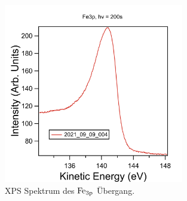             \begin{figure}
                \centering
                \includegraphics[width=0.7\textwidth]{./content/pictures/FeO/XPS_Fe3p.png}
                \caption{XPS Spektrum des $\ce{Fe}_{3\text{p}}$ Übergang.}
                \label{fig:XPSFe3p}
            \end{figure}


